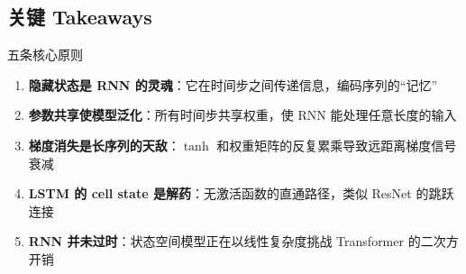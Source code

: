 \subsection{关键 Takeaways}

\begin{importantbox}{五条核心原则}
\begin{enumerate}
    \item \textbf{隐藏状态是 RNN 的灵魂}：它在时间步之间传递信息，编码序列的``记忆''
    \item \textbf{参数共享使模型泛化}：所有时间步共享权重，使 RNN 能处理任意长度的输入
    \item \textbf{梯度消失是长序列的天敌}：$\tanh$ 和权重矩阵的反复累乘导致远距离梯度信号衰减
    \item \textbf{LSTM 的 cell state 是解药}：无激活函数的直通路径，类似 ResNet 的跳跃连接
    \item \textbf{RNN 并未过时}：状态空间模型正在以线性复杂度挑战 Transformer 的二次方开销
\end{enumerate}
\end{importantbox}


